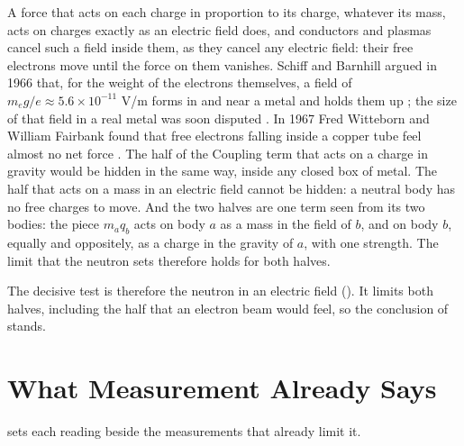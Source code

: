 \begin{remark}\label{rem:op-screen}
A force that acts on each charge in proportion to its charge, whatever its mass, acts on charges exactly as an electric field does, and conductors and plasmas cancel such a field inside them, as they cancel any electric field: their free electrons move until the force on them vanishes. Schiff and Barnhill argued in 1966 that, for the weight of the electrons themselves, a field of $m_e g/e \approx 5.6 \times 10^{-11}$ V/m forms in and near a metal and holds them up \citep{SchiffBarnhill1966}; the size of that field in a real metal was soon disputed \citep{Dessler1968}. In 1967 Fred Witteborn and William Fairbank found that free electrons falling inside a copper tube feel almost no net force \citep{WittebornFairbank1967}. The half of the Coupling term that acts on a charge in gravity would be hidden in the same way, inside any closed box of metal. The half that acts on a mass in an electric field cannot be hidden: a neutral body has no free charges to move. And the two halves are one term seen from its two bodies: the piece $m_a q_b$ acts on body $a$ as a mass in the field of $b$, and on body $b$, equally and oppositely, as a charge in the gravity of $a$, with one strength. The limit that the neutron sets therefore holds for both halves.
\end{remark}

The decisive test is therefore the neutron in an electric field (). It limits both halves, including the half that an electron beam would feel, so the conclusion of  stands.

\section{What Measurement Already Says}\label{sec:op-measured}

 sets each reading beside the measurements that already limit it.

